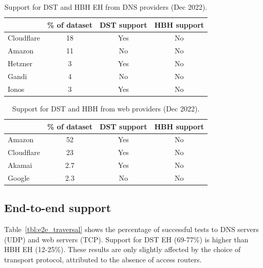 \documentclass[conference]{IEEEtran}
\begin{document}
\begin{table} 
\centering
\caption{Support for DST and HBH EH from DNS providers (Dec 2022).}
\begin{tabular}{l|c|c|c}
           & \% of dataset &  DST support & HBH support\\
\hline \hline
Cloudflare & 18   & Yes  & No                 \\
\hline
Amazon     & 11   & No   & No                 \\
\hline
Hetzner    & 3    & Yes  & No                 \\
\hline
Gandi      & 4    & No   & No                 \\
\hline
Ionos      & 3    & Yes  & No                
\end{tabular}
\label{tbl:provider_support}
\end{table}


\begin{table} 
\centering
\caption{Support for DST and HBH from web providers (Dec 2022).}
\begin{tabular}{l|c|c|c}
           & \% of dataset & DST support & HBH support\\
\hline
\hline
Amazon       & 52                     & Yes                & No                 \\
\hline
Cloudflare   & 23                     & Yes                & No                 \\
\hline
Akamai       & 2.7                    & Yes                & No                 \\
\hline
Google       & 2.3                    & No                 & No                 
\end{tabular}
\label{tbl:web_providers}
\end{table}


\subsection{End-to-end support}
\label{subsec:e2esupport}

Table~\ref{tbl:e2e_traversal} shows the percentage of successful tests to 
DNS servers (UDP) and web servers (TCP). Support for DST EH (69-77\%)  
is higher than HBH EH (12-25\%). These results are only slightly affected by the 
choice of transport protocol,  attributed to the
absence of access routers.

\end{document}
